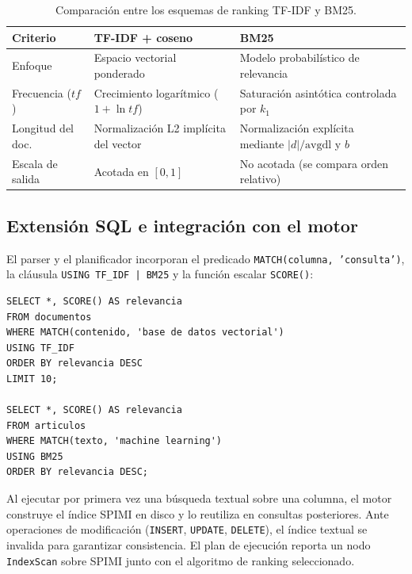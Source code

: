 \documentclass[11pt,a4paper]{article}
\begin{document}
\begin{table}[H]
  \centering
  \small
  \begin{tabular}{@{}p{3.2cm}p{5.2cm}p{5.2cm}@{}}
    \toprule
    \textbf{Criterio} & \textbf{TF-IDF + coseno} & \textbf{BM25} \\
    \midrule
    Enfoque & Espacio vectorial ponderado & Modelo probabilístico de relevancia \\
    Frecuencia ($tf$) & Crecimiento logarítmico ($1 + \ln tf$) & Saturación asintótica controlada por $k_1$ \\
    Longitud del doc. & Normalización L2 implícita del vector & Normalización explícita mediante $|d|/\mathrm{avgdl}$ y $b$ \\
    Escala de salida & Acotada en $[0, 1]$ & No acotada (se compara orden relativo) \\
    \bottomrule
  \end{tabular}
  \caption{Comparación entre los esquemas de ranking TF-IDF y BM25.}
  \label{tab:tfidf-bm25}
\end{table}

\subsection{Extensión SQL e integración con el motor}
\label{sec:sql-texto}

El parser y el planificador incorporan el predicado \texttt{MATCH(columna, 'consulta')}, la cláusula \texttt{USING TF\_IDF | BM25} y la función escalar \texttt{SCORE()}:

\begin{lstlisting}[style=sql,caption={Consultas de búsqueda de texto completo con TF-IDF y BM25}]
SELECT *, SCORE() AS relevancia
FROM documentos
WHERE MATCH(contenido, 'base de datos vectorial')
USING TF_IDF
ORDER BY relevancia DESC
LIMIT 10;

SELECT *, SCORE() AS relevancia
FROM articulos
WHERE MATCH(texto, 'machine learning')
USING BM25
ORDER BY relevancia DESC;
\end{lstlisting}

Al ejecutar por primera vez una búsqueda textual sobre una columna, el motor construye el índice SPIMI en disco y lo reutiliza en consultas posteriores. Ante operaciones de modificación (\texttt{INSERT}, \texttt{UPDATE}, \texttt{DELETE}), el índice textual se invalida para garantizar consistencia. El plan de ejecución reporta un nodo \texttt{IndexScan} sobre SPIMI junto con el algoritmo de ranking seleccionado.
\end{document}
